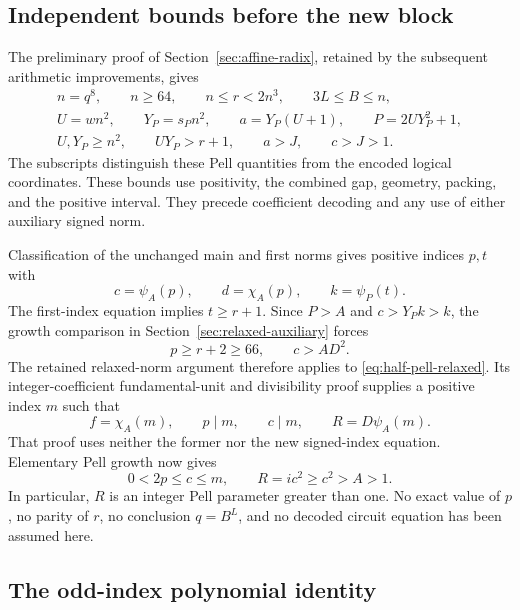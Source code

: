 \subsection{Independent bounds before the new block}

The preliminary proof of Section~\ref{sec:affine-radix}, retained
by the subsequent arithmetic improvements, gives
\begin{equation}\label{eq:half-pell-preliminary}
 \begin{gathered}
 n=q^8,\qquad n\ge64,\qquad n\le r<2n^3,\qquad 3L\le B\le n,\\
 U=wn^2,\qquad Y_P=s_Pn^2,\qquad a=Y_P(U+1),\qquad
 P=2UY_P^2+1,\\
 U,Y_P\ge n^2,\qquad UY_P>r+1,\qquad a>J,\qquad c>J>1.
 \end{gathered}
\end{equation}
The subscripts distinguish these Pell quantities from the encoded
logical coordinates. These bounds use positivity, the combined gap,
geometry, packing, and the positive interval. They precede coefficient
decoding and any use of either auxiliary signed norm.

Classification of the unchanged main and first norms gives positive
indices $p,t$ with
\[
 c=\psi_A(p),\qquad d=\chi_A(p),\qquad k=\psi_P(t).
\]
The first-index equation implies $t\ge r+1$. Since $P>A$ and
$c>Y_Pk>k$, the growth comparison in
Section~\ref{sec:relaxed-auxiliary} forces
\begin{equation}\label{eq:half-pell-large-index}
 p\ge r+2\ge66,\qquad c>AD^2.
\end{equation}
The retained relaxed-norm argument therefore applies to
\eqref{eq:half-pell-relaxed}. Its integer-coefficient fundamental-unit
and divisibility proof supplies a positive index $m$ such that
\begin{equation}\label{eq:half-pell-auxiliary-index}
 f=\chi_A(m),\qquad p\mid m,\qquad c\mid m,
 \qquad R=D\psi_A(m).
\end{equation}
That proof uses neither the former nor the new signed-index equation.
Elementary Pell growth now gives
\begin{equation}\label{eq:half-pell-comparison}
 0<2p\le c\le m,\qquad R=ic^2\ge c^2>A>1.
\end{equation}
In particular, $R$ is an integer Pell parameter greater than one.
No exact value of $p$, no parity of $r$, no conclusion $q=B^L$,
and no decoded circuit equation has been assumed here.

\subsection{The odd-index polynomial identity}

